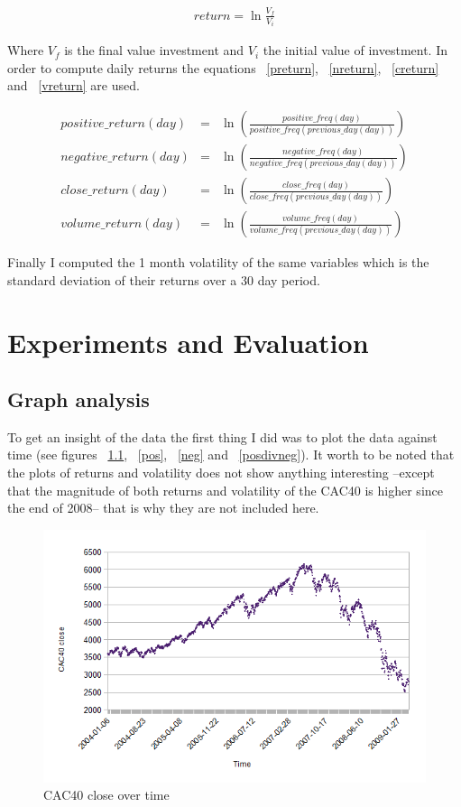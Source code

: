 \documentclass[12pt]{report}
\begin{document}
\begin{eqnarray}
	return = \ln\frac{V_f}{V_i}\label{return}
\end{eqnarray}

Where $V_f$ is the final value investment and $V_i$ the initial value of investment. In order to compute daily returns the equations ~\ref{preturn}, ~\ref{nreturn}, ~\ref{creturn} and ~\ref{vreturn} are used.

\begin{eqnarray}
	positive\_return(day) &=& \ln\left(\frac{positive\_freq(day)}{positive\_freq(previous\_day(day))}\right)\label{preturn}\\
			 negative\_return(day) &=& \ln\left(\frac{negative\_freq(day)}{negative\_freq(previous\_day(day))}\right)\label{nreturn}\\
				   close\_return(day) &=& \ln\left(\frac{close\_freq(day)}{close\_freq(previous\_day(day))}\right)\label{creturn}\\
				  volume\_return(day) &=& \ln\left(\frac{volume\_freq(day)}{volume\_freq(previous\_day(day))}\right)\label{vreturn}
\end{eqnarray}

Finally I computed the 1 month volatility of the same variables which is the standard deviation of their returns over a 30 day period.

\chapter{Experiments and Evaluation}
\section{Graph analysis}

To get an insight of the data the first thing I did was to plot the data against time (see figures ~\ref{cac}, ~\ref{pos}, ~\ref{neg} and ~\ref{posdivneg}). It worth to be noted that the plots of returns and volatility does not show anything interesting --except that the magnitude of both returns and volatility of the CAC40 is higher since the end of 2008-- that is why they are not included here.

\begin{figure}[h!]
	\caption{CAC40 close over time\label{cac}}
	\includegraphics{plots/time/cac.png}
\end{figure}
\end{document}
